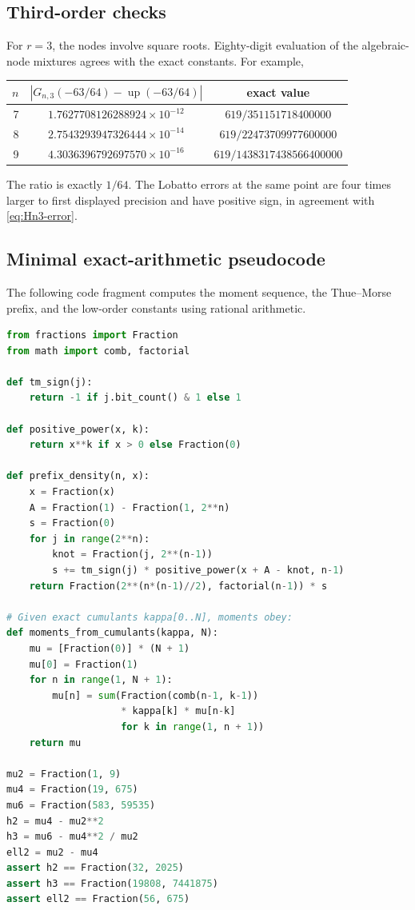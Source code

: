 \documentclass[11pt]{article}
\numberwithin{equation}{section}
\theoremstyle{definition}
\theoremstyle{remark}
\newcommand{\Up}{\operatorname{up}}
\newcommand{\abs}[1]{\left|#1\right|}
\begin{document}
\subsection{Third-order checks}

For $r=3$, the nodes involve square roots.  Eighty-digit evaluation of the algebraic-node mixtures agrees with the exact constants.  For example,
\begin{center}
\begin{tabular}{@{}rcc@{}}
\toprule
$n$ & $\abs{G_{n,3}(-63/64)-\Up(-63/64)}$ & exact value\\
\midrule
7 & $1.7627708126288924\times10^{-12}$ & $619/351151718400000$\\
8 & $2.7543293947326444\times10^{-14}$ & $619/22473709977600000$\\
9 & $4.3036396792697570\times10^{-16}$ & $619/1438317438566400000$\\
\bottomrule
\end{tabular}
\end{center}
The ratio is exactly $1/64$.  The Lobatto errors at the same point are four times larger to first displayed precision and have positive sign, in agreement with \eqref{eq:Hn3-error}.

\subsection{Minimal exact-arithmetic pseudocode}

The following code fragment computes the moment sequence, the Thue--Morse prefix, and the low-order constants using rational arithmetic.

\begin{lstlisting}[style=code,language=Python,caption={Exact arithmetic for moments and dyadic prefix values.}]
from fractions import Fraction
from math import comb, factorial

def tm_sign(j):
    return -1 if j.bit_count() & 1 else 1

def positive_power(x, k):
    return x**k if x > 0 else Fraction(0)

def prefix_density(n, x):
    x = Fraction(x)
    A = Fraction(1) - Fraction(1, 2**n)
    s = Fraction(0)
    for j in range(2**n):
        knot = Fraction(j, 2**(n-1))
        s += tm_sign(j) * positive_power(x + A - knot, n-1)
    return Fraction(2**(n*(n-1)//2), factorial(n-1)) * s

# Given exact cumulants kappa[0..N], moments obey:
def moments_from_cumulants(kappa, N):
    mu = [Fraction(0)] * (N + 1)
    mu[0] = Fraction(1)
    for n in range(1, N + 1):
        mu[n] = sum(Fraction(comb(n-1, k-1))
                    * kappa[k] * mu[n-k]
                    for k in range(1, n + 1))
    return mu

mu2 = Fraction(1, 9)
mu4 = Fraction(19, 675)
mu6 = Fraction(583, 59535)
h2 = mu4 - mu2**2
h3 = mu6 - mu4**2 / mu2
ell2 = mu2 - mu4
assert h2 == Fraction(32, 2025)
assert h3 == Fraction(19808, 7441875)
assert ell2 == Fraction(56, 675)
\end{lstlisting}
\end{document}
